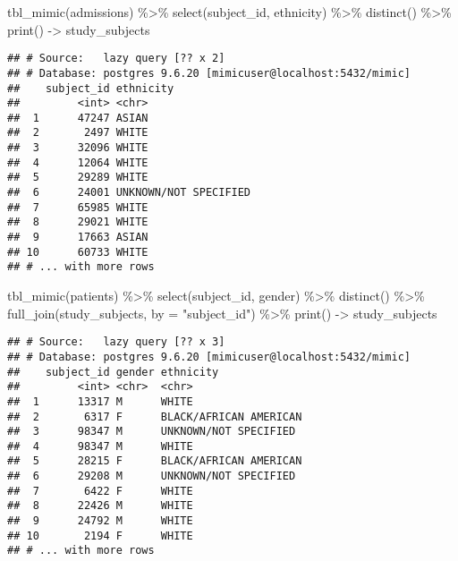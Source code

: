 \documentclass[
]{article}
\newenvironment{Shaded}{\begin{snugshade}}{\end{snugshade}}
\newcommand{\AttributeTok}[1]{\textcolor[rgb]{0.77,0.63,0.00}{#1}}
\newcommand{\FunctionTok}[1]{\textcolor[rgb]{0.00,0.00,0.00}{#1}}
\newcommand{\NormalTok}[1]{#1}
\newcommand{\OtherTok}[1]{\textcolor[rgb]{0.56,0.35,0.01}{#1}}
\newcommand{\SpecialCharTok}[1]{\textcolor[rgb]{0.00,0.00,0.00}{#1}}
\newcommand{\StringTok}[1]{\textcolor[rgb]{0.31,0.60,0.02}{#1}}
\begin{document}
\begin{Shaded}
\begin{Highlighting}[]
\FunctionTok{tbl\_mimic}\NormalTok{(admissions) }\SpecialCharTok{\%\textgreater{}\%}
  \FunctionTok{select}\NormalTok{(subject\_id, ethnicity) }\SpecialCharTok{\%\textgreater{}\%}
  \FunctionTok{distinct}\NormalTok{() }\SpecialCharTok{\%\textgreater{}\%}
  \FunctionTok{print}\NormalTok{() }\OtherTok{{-}\textgreater{}}\NormalTok{ study\_subjects}
\end{Highlighting}
\end{Shaded}

\begin{verbatim}
## # Source:   lazy query [?? x 2]
## # Database: postgres 9.6.20 [mimicuser@localhost:5432/mimic]
##    subject_id ethnicity            
##         <int> <chr>                
##  1      47247 ASIAN                
##  2       2497 WHITE                
##  3      32096 WHITE                
##  4      12064 WHITE                
##  5      29289 WHITE                
##  6      24001 UNKNOWN/NOT SPECIFIED
##  7      65985 WHITE                
##  8      29021 WHITE                
##  9      17663 ASIAN                
## 10      60733 WHITE                
## # ... with more rows
\end{verbatim}

\begin{Shaded}
\begin{Highlighting}[]
\FunctionTok{tbl\_mimic}\NormalTok{(patients) }\SpecialCharTok{\%\textgreater{}\%}
  \FunctionTok{select}\NormalTok{(subject\_id, gender) }\SpecialCharTok{\%\textgreater{}\%}
  \FunctionTok{distinct}\NormalTok{() }\SpecialCharTok{\%\textgreater{}\%}
  \FunctionTok{full\_join}\NormalTok{(study\_subjects, }\AttributeTok{by =} \StringTok{"subject\_id"}\NormalTok{) }\SpecialCharTok{\%\textgreater{}\%}
  \FunctionTok{print}\NormalTok{() }\OtherTok{{-}\textgreater{}}\NormalTok{ study\_subjects}
\end{Highlighting}
\end{Shaded}

\begin{verbatim}
## # Source:   lazy query [?? x 3]
## # Database: postgres 9.6.20 [mimicuser@localhost:5432/mimic]
##    subject_id gender ethnicity             
##         <int> <chr>  <chr>                 
##  1      13317 M      WHITE                 
##  2       6317 F      BLACK/AFRICAN AMERICAN
##  3      98347 M      UNKNOWN/NOT SPECIFIED 
##  4      98347 M      WHITE                 
##  5      28215 F      BLACK/AFRICAN AMERICAN
##  6      29208 M      UNKNOWN/NOT SPECIFIED 
##  7       6422 F      WHITE                 
##  8      22426 M      WHITE                 
##  9      24792 M      WHITE                 
## 10       2194 F      WHITE                 
## # ... with more rows
\end{verbatim}
\end{document}
